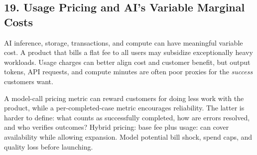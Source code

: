 \subsection*{19. Usage Pricing and AI's Variable Marginal Costs}

AI inference, storage, transactions, and compute can have meaningful variable cost. A product that bills a flat fee to all users may subsidize exceptionally heavy workloads. Usage charges can better align cost and customer benefit, but output tokens, API requests, and compute minutes are often poor proxies for the \emph{success} customers want.

A model-call pricing metric can reward customers for doing less work with the product, while a per-completed-case metric encourages reliability. The latter is harder to define: what counts as successfully completed, how are errors resolved, and who verifies outcomes? Hybrid pricing: base fee plus usage: can cover availability while allowing expansion. Model potential bill shock, spend caps, and quality loss before launching.
